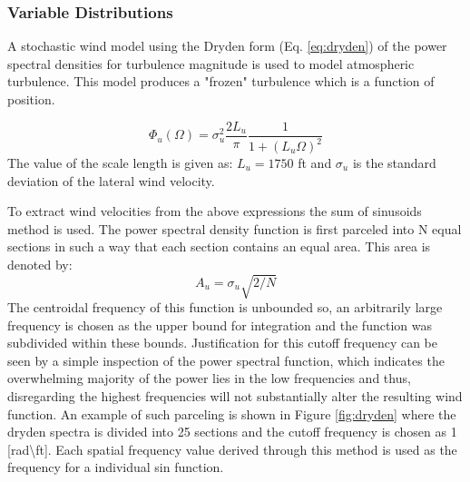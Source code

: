 \documentclass[10pt,a4paper]{article}
\begin{document}
\subsubsection{Variable Distributions}

A stochastic wind model using the Dryden form (Eq. \ref{eq:dryden}) of the power spectral densities for turbulence magnitude is used to model atmospheric turbulence\cite{dryden}. This model produces a "frozen" turbulence which is a function of position.


\begin{equation}
\Phi_u (\Omega) = \sigma_u^2 \frac{2L_u}{\pi}\frac{1}{1+(L_u\Omega)^2}
\label{eq:dryden}
\end{equation}
The value of the scale length is given as: $L_u = 1750$ ft and $\sigma_u$ is the standard deviation of the lateral wind velocity.

To extract wind velocities from the above expressions the sum of sinusoids method is used. The power spectral density function is first parceled into N equal sections in such a way that each section contains an equal area. This area is denoted by:
\begin{equation}
A_u =\sigma_u\sqrt{2/N}
\end{equation}
The centroidal frequency of this function is unbounded so, an arbitrarily large frequency is chosen as the upper bound for integration and the function was subdivided within these bounds. Justification for this cutoff frequency can be seen by a simple inspection of the power spectral function, which indicates the overwhelming majority of the power lies in the low frequencies  and thus, disregarding the highest frequencies will not substantially alter the resulting wind function. An example of such parceling is shown in Figure \ref{fig:dryden} where the dryden spectra is divided into 25 sections and the cutoff frequency is chosen as 1 [rad\textbackslash ft]. Each spatial frequency value derived through this method is used as the frequency for a individual sin function.
\end{document}
